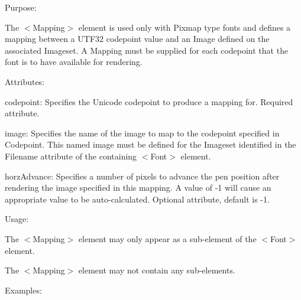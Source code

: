 \begin{DoxyItemize}
\item Purpose\+:
\begin{DoxyItemize}
\item The $<$Mapping$>$ element is used only with Pixmap type fonts and defines a mapping between a U\+T\+F32 codepoint value and an Image defined on the associated Imageset. A Mapping must be supplied for each codepoint that the font is to have available for rendering.
\end{DoxyItemize}
\item Attributes\+:
\begin{DoxyItemize}
\item {\ttfamily codepoint\+:} Specifies the Unicode codepoint to produce a mapping for. Required attribute.
\item {\ttfamily image\+:} Specifies the name of the image to map to the codepoint specified in {\ttfamily Codepoint}. This named image must be defined for the Imageset identified in the {\ttfamily Filename} attribute of the containing $<$Font$>$ element.
\item {\ttfamily horz\+Advance\+:} Specifies a number of pixels to advance the \textquotesingle{}pen\textquotesingle{} position after rendering the image specified in this mapping. A value of -\/1 will cause an appropriate value to be auto-\/calculated. Optional attribute, default is -\/1.
\end{DoxyItemize}
\item Usage\+:
\begin{DoxyItemize}
\item The $<$Mapping$>$ element may only appear as a sub-\/element of the $<$Font$>$ element.
\item The $<$Mapping$>$ element may not contain any sub-\/elements.
\end{DoxyItemize}
\item Examples\+: 
\end{DoxyItemize}